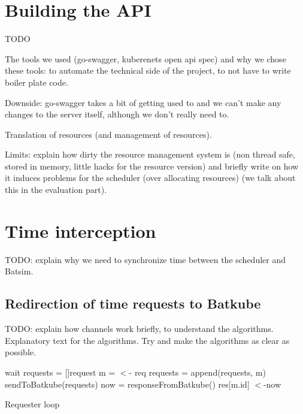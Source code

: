 \section{Building the API}

TODO

The tools we used (go-swagger, kuberenets open api spec) and why we chose
these tools: to automate the technical side of the project, to not have to
write boiler plate code.

Downside: go-swagger takes a bit of getting used to
and we can't make any changes to the server itself, although we don't really
need to.  

Translation of resources (and management of resources).

Limits: explain how dirty the resource management system is (non
thread safe, stored in memory, little hacks for the resource version) and
briefly write on how it induces problems for the scheduler (over allocating
resources) (we talk about this in the evaluation part).

\section{Time interception}

TODO: explain why we need to synchronize time between the scheduler and Batsim.

\subsection{Redirection of time requests to Batkube}

TODO: explain how channels work briefly, to understand the algorithms.
Explanatory text for the algorithms. Try and make the algorithms as clear as possible.



\begin{algorithm}[H]
\DontPrintSemicolon
{}
 {
	wait\;
}
requests = []request\;
 {
	m = $<$- req 
	requests = append(requests, m)\;
}
sendToBatkube(requests) 
now = responseFromBatkube()\;
 {
	res[m.id] $<$-now 
}

	
\caption{Requester loop}
\label{alg:reqLoop}
\end{algorithm}



